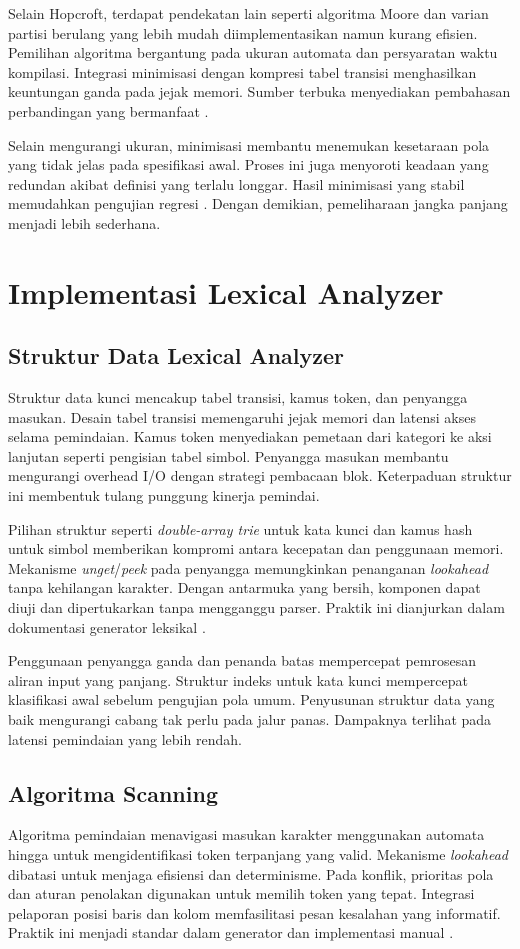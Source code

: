 \documentclass[../main.tex]{subfiles}
\begin{document}
Selain Hopcroft, terdapat pendekatan lain seperti algoritma Moore dan varian partisi berulang yang lebih mudah diimplementasikan namun kurang efisien. Pemilihan algoritma bergantung pada ukuran automata dan persyaratan waktu kompilasi. Integrasi minimisasi dengan kompresi tabel transisi menghasilkan keuntungan ganda pada jejak memori. Sumber terbuka menyediakan pembahasan perbandingan yang bermanfaat \citep{WikiDFAMin,Mogensen2010}.

Selain mengurangi ukuran, minimisasi membantu menemukan kesetaraan pola yang tidak jelas pada spesifikasi awal. Proses ini juga menyoroti keadaan yang redundan akibat definisi yang terlalu longgar. Hasil minimisasi yang stabil memudahkan pengujian regresi \citep{WikiDFAMin}. Dengan demikian, pemeliharaan jangka panjang menjadi lebih sederhana.

\section{Implementasi Lexical Analyzer}
\subsection{Struktur Data Lexical Analyzer}
Struktur data kunci mencakup tabel transisi, kamus token, dan penyangga masukan. Desain tabel transisi memengaruhi jejak memori dan latensi akses selama pemindaian. Kamus token menyediakan pemetaan dari kategori ke aksi lanjutan seperti pengisian tabel simbol. Penyangga masukan membantu mengurangi overhead I/O dengan strategi pembacaan blok. Keterpaduan struktur ini membentuk tulang punggung kinerja pemindai.

Pilihan struktur seperti \emph{double-array trie} untuk kata kunci dan kamus hash untuk simbol memberikan kompromi antara kecepatan dan penggunaan memori. Mekanisme \emph{unget}/\emph{peek} pada penyangga memungkinkan penanganan \emph{lookahead} tanpa kehilangan karakter. Dengan antarmuka yang bersih, komponen dapat diuji dan dipertukarkan tanpa mengganggu parser. Praktik ini dianjurkan dalam dokumentasi generator leksikal \citep{FlexManual}.

Penggunaan penyangga ganda dan penanda batas mempercepat pemrosesan aliran input yang panjang. Struktur indeks untuk kata kunci mempercepat klasifikasi awal sebelum pengujian pola umum. Penyusunan struktur data yang baik mengurangi cabang tak perlu pada jalur panas. Dampaknya terlihat pada latensi pemindaian yang lebih rendah.

\subsection{Algoritma Scanning}
Algoritma pemindaian menavigasi masukan karakter menggunakan automata hingga untuk mengidentifikasi token terpanjang yang valid. Mekanisme \emph{lookahead} dibatasi untuk menjaga efisiensi dan determinisme. Pada konflik, prioritas pola dan aturan penolakan digunakan untuk memilih token yang tepat. Integrasi pelaporan posisi baris dan kolom memfasilitasi pesan kesalahan yang informatif. Praktik ini menjadi standar dalam generator dan implementasi manual \citep{FlexManual}.
\end{document}
